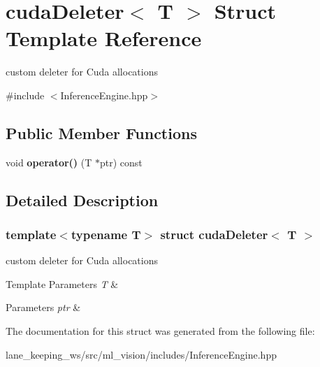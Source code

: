 \hypertarget{structcudaDeleter}{}\section{cuda\+Deleter$<$ T $>$ Struct Template Reference}
\label{structcudaDeleter}


custom deleter for Cuda allocations  




{\ttfamily \#include $<$Inference\+Engine.\+hpp$>$}

\subsection*{Public Member Functions}
\begin{DoxyCompactItemize}
\item 
\mbox{\label{structcudaDeleter_abb2b0fa5a5f7ddcd45a9b8ce2cdf1f28}} 
void {\bfseries operator()} (T $\ast$ptr) const
\end{DoxyCompactItemize}


\subsection{Detailed Description}
\subsubsection*{template$<$typename T$>$\newline
struct cuda\+Deleter$<$ T $>$}

custom deleter for Cuda allocations 


\begin{DoxyTemplParams}{Template Parameters}
{\em T} & \\
\hline
\end{DoxyTemplParams}

\begin{DoxyParams}{Parameters}
{\em ptr} & \\
\hline
\end{DoxyParams}


The documentation for this struct was generated from the following file\+:\begin{DoxyCompactItemize}
\item 
lane\+\_\+keeping\+\_\+ws/src/ml\+\_\+vision/includes/Inference\+Engine.\+hpp\end{DoxyCompactItemize}
